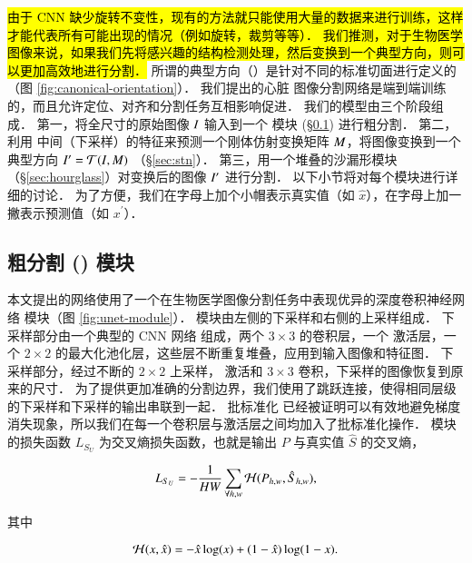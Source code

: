 
\hl{
由于 CNN 缺少旋转不变性，现有的方法就只能使用大量的数据来进行训练，这样才能代表所有可能出现的情况（例如旋转，裁剪等等）．
我们推测，对于生物医学图像来说，如果我们先将感兴趣的结构检测处理，然后变换到一个典型方向，则可以更加高效地进行分割．
}
所谓的典型方向（\CMR{}）是针对不同的标准切面进行定义的（图 \ref{fig:canonical-orientation}）．
我们提出的心脏 \SSFP{} 图像分割网络是端到端训练的，而且允许定位、对齐和分割任务互相影响促进．
我们的模型由三个阶段组成．
第一，将全尺寸的原始图像 $I$ 输入到一个 \UNet{} 模块 (\S \ref{sec:unet}) 进行粗分割． 
第二，利用 \UNet{} 中间（下采样）的特征来预测一个刚体仿射变换矩阵 $M$，将图像变换到一个典型方向 $I^\prime = \mathcal{T}(I, M)$ （\S\ref{sec:stn}）．
第三，用一个堆叠的沙漏形模块（\S\ref{sec:hourglass}）对变换后的图像 $I^\prime$ 进行分割．
以下小节将对每个模块进行详细的讨论．
为了方便，我们在字母上加个小帽表示真实值（如 $\hat{x}$），在字母上加一撇表示预测值（如 $x^\prime$）．

\subsection{粗分割 (\UNet{}) 模块}\label{sec:unet}



本文提出的网络使用了一个在生物医学图像分割任务\citep{Long2015,Ronneberger2015,Xie2015}中表现优异的深度卷积神经网络 \UNet{} 模块（图 \ref{fig:unet-module}）．
\UNet{} 模块由左侧的下采样和右侧的上采样组成．
下采样部分由一个典型的 CNN 网络 \citep{Krizhevsky2012,Simonyan2015} 组成，两个 $3 \times 3$ 的卷积层，一个 \ReLU{} 激活层，一个 $2 \times 2$ 的最大化池化层，这些层不断重复堆叠，应用到输入图像和特征图．
下采样部分，经过不断的 $2 \times 2$ 上采样，\ReLU{} 激活和 $3 \times 3$ 卷积，下采样的图像恢复到原来的尺寸．
为了提供更加准确的分割边界，我们使用了跳跃连接，使得相同层级的下采样和下采样的输出串联到一起．
批标准化 \mbox{\citep{Ioffe2015}} 已经被证明可以有效地避免梯度消失现象，所以我们在每一个卷积层与激活层之间均加入了批标准化操作．
\UNet{} 模块的损失函数 $L_{S_U}$ 为交叉熵损失函数，也就是输出 $P$ 与真实值 $\hat{S}$ 的交叉熵，

\begin{equation}\label{eqn:unet-loss}
L_{S_U} = -\frac{1}{HW} \sum_{\forall h,w} \mathcal{H}(P_{h,w}, \hat{S}_{h,w}),
\end{equation}

\noindent 其中

\begin{equation}\label{eqn:cross-entropy}
\mathcal{H}(x, \hat{x}) = - \hat{x} \log(x) + (1 - \hat{x}) \log(1 - x).
\end{equation}

